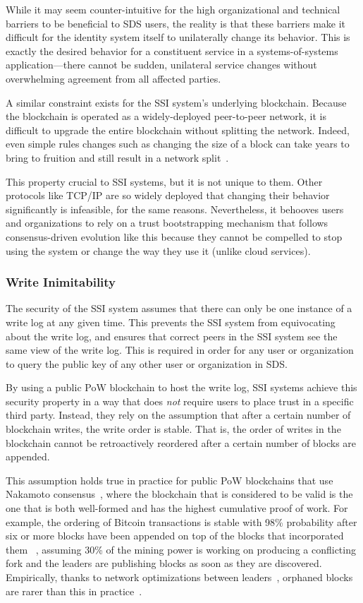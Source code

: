 While it may seem counter-intuitive for the high organizational and technical
barriers to be beneficial to SDS users, the reality is that these barriers
make it difficult for the identity system itself to unilaterally change its
behavior.  This is exactly the desired behavior for a constituent service in a
systems-of-systems application---there cannot be sudden,
unilateral service changes without overwhelming agreement from all affected parties.

A similar constraint exists for the SSI system's underlying blockchain.
Because the blockchain is operated as a widely-deployed peer-to-peer network,
it is difficult to upgrade the entire blockchain without splitting the network.
Indeed, even simple rules changes such as changing the size of a block can take 
years to bring to fruition and still result in a network
split~\cite{bitcoin-cash-split}.

This property crucial to SSI systems, but it is not unique to them.
Other protocols like TCP/IP are so
widely deployed that changing their behavior significantly is infeasible, for
the same reasons.  Nevertheless, it behooves users and organizations to rely on a trust
bootstrapping mechanism that follows consensus-driven evolution like this
because they cannot be compelled to stop using the system or change the way they
use it (unlike cloud services).

\subsubsection{Write Inimitability}

The security of the SSI system assumes that there can only be one instance of a write
log at any given time.  This prevents the SSI system from equivocating about the write log, and
ensures that correct peers in the SSI system see the same view of the write log.  This
is required in order for any user or organization to query the public key of any other 
user or organization in SDS.

By using a public PoW blockchain to host the write log, SSI systems achieve
this security property in a way that does \emph{not} require users to place
trust in a specific third party.  Instead, they rely on the assumption that after a certain number
of blockchain writes, the write order is stable.  That is, the order of writes
in the blockchain cannot be retroactively reordered after a certain number of
blocks are appended.

This assumption holds true in practice for public PoW blockchains that use
Nakamoto consensus~\cite{bitcoin-pedigree}, where the blockchain that is
considered to be valid is the one that is both well-formed and has the highest
cumulative proof of work.  For example, the ordering of Bitcoin transactions
is stable with 98\% probability after six or more blocks have been appended on top of
the blocks that incorporated them
~\cite{bitcoin}, assuming 30\% of the mining power is working on producing a
conflicting fork and the leaders are publishing blocks as soon as they are discovered.
Empirically, thanks to network optimizations between leaders~\cite{bitcoin-miner-network},
orphaned blocks are rarer than this in practice~\cite{blockchain-info-orphan-rate}.

